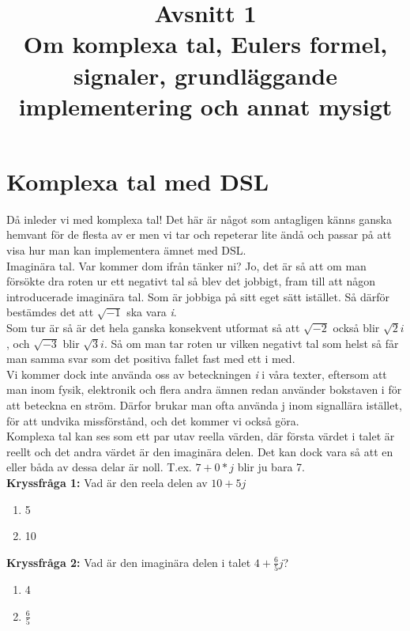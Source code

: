 \documentclass{article}
\title{Avsnitt 1 \\
\large Om komplexa tal, Eulers formel, signaler, grundläggande implementering och annat mysigt}
\author{ }
\date{}
\begin{document}
\maketitle

\section{Komplexa tal med DSL}
Då inleder vi med komplexa tal! Det här är något som antagligen känns ganska
hemvant för de flesta av er men vi tar och repeterar lite ändå och passar på
att visa hur man kan implementera ämnet med DSL. \\

Imaginära tal. Var kommer dom ifrån tänker ni? Jo, det är så att om man
försökte dra roten ur ett negativt tal så blev det jobbigt, fram till att
någon introducerade imaginära tal. Som är jobbiga på sitt eget sätt istället.
Så därför bestämdes det att $\sqrt{-1}$ ska vara \emph{i}. \\

Som tur är så är det hela ganska konsekvent utformat så att $\sqrt{-2}$ också blir $\sqrt{2}i$, och $\sqrt{-3}$ blir $\sqrt{3} i$. Så om man tar roten ur vilken negativt tal som helst så får man samma svar som det positiva fallet fast med ett i med. \\
\newline
Vi kommer dock inte använda oss av beteckningen \emph{i} i våra texter, eftersom att man inom fysik, elektronik och flera andra ämnen redan använder bokstaven i  för att beteckna en ström. Därfor brukar man ofta använda j inom signallära istället, för att undvika missförstånd, och det kommer vi också göra. \\
\newline
Komplexa tal kan ses som ett par utav reella värden, där första
värdet i talet är reellt och det andra värdet är den imaginära
delen. Det kan dock vara så att en eller båda av dessa delar är noll.
T.ex. $7+0*j$ blir ju bara 7. \\
\newline
\textbf{Kryssfråga 1:} Vad är den reela delen av $10 + 5 j$
\begin{enumerate}[label={\alph*)},font={\bfseries}]
\item 5
\item 10
\end{enumerate}
\textbf{Kryssfråga 2:} Vad är den imaginära delen i talet $4 + \frac{6}{5}j$?
\begin{enumerate}[label={\alph*)},font={\bfseries}]
\item 4
\item $\frac{6}{5}$
\end{enumerate}
\end{document}
